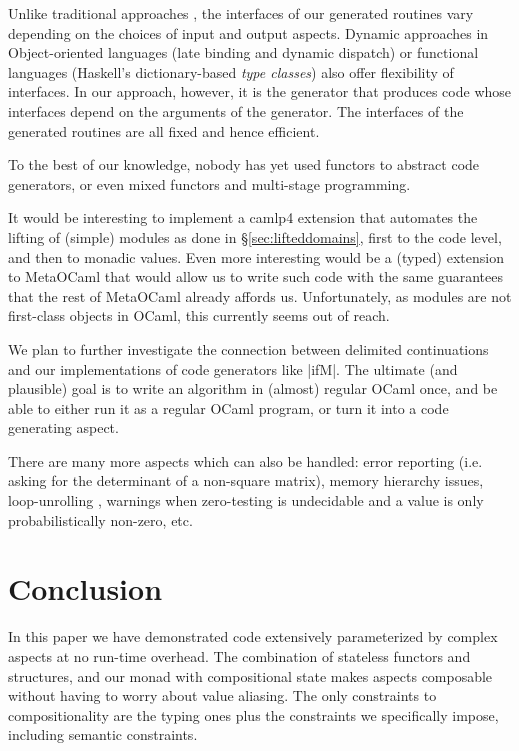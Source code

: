 \documentclass{elsart}
\begin{document}
Unlike traditional approaches
\cite{journals/cacm/parnas72a}, the interfaces of our generated
routines vary depending on the choices of input and output
aspects. Dynamic approaches in Object-oriented languages (late binding
and dynamic dispatch) or functional languages (Haskell's
dictionary-based \emph{type classes}) also offer flexibility of
interfaces. In our approach, however, it is the generator that
produces code whose interfaces depend on the arguments of the
generator. The interfaces of the generated routines are all fixed and
hence efficient.

To the best of our knowledge, nobody has yet used functors to
abstract code generators, or even mixed functors and 
multi-stage programming.

It would be interesting to implement a camlp4 extension that 
automates the lifting of (simple) modules as done in 
\S\ref{sec:lifteddomains},
first to the code level, and then to monadic values.  Even more
interesting would be a (typed) extension to MetaOCaml that would 
allow us to write such code with the same guarantees that the rest of
MetaOCaml already affords us.  Unfortunately, as modules are not first-class
objects in OCaml, this currently seems out of reach.

We plan to further investigate the connection between delimited
continuations and our implementations of code generators like
|ifM|. The ultimate (and plausible) goal is to write an
algorithm in (almost) regular OCaml once, and be able to either
run it as a regular OCaml program, or turn it into a code generating
aspect.

There are many more aspects which can also be handled:
error reporting (i.e. asking for the determinant of a 
non-square matrix), memory hierarchy issues, loop-unrolling
\cite{scp-CohenDGHKP06},
warnings when zero-testing is undecidable and
a value is only probabilistically non-zero, etc.

\section{Conclusion}\label{conclusion}
In this paper we have demonstrated code extensively parameterized
by complex aspects at no run-time overhead.  The combination of
stateless functors and structures, and our monad with
compositional state makes aspects composable without having to
worry about value aliasing. The only constraints to compositionality
are the typing ones plus the constraints we specifically
impose, including semantic constraints.
\end{document}
